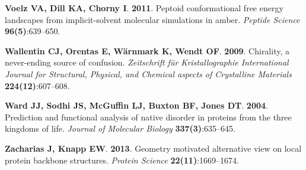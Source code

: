 \documentclass[fleqn,10pt,lineno]{wlpeerj} %
\begin{document}
\begin{thebibliography}{60}
\textbf{Voelz VA, Dill KA, Chorny I}. \textbf{2011}.
\newblock Peptoid conformational free energy landscapes from implicit-solvent
  molecular simulations in amber.
\newblock \emph{Peptide Science} \textbf{96(5)}:639--650.

\textbf{Wallentin CJ, Orentas E, W{\"a}rnmark K, Wendt OF}. \textbf{2009}.
\newblock Chirality, a never-ending source of confusion.
\newblock \emph{Zeitschrift f{\"u}r Kristallographie International Journal for
  Structural, Physical, and Chemical aspects of Crystalline Materials}
  \textbf{224(12)}:607--608.

\textbf{Ward JJ, Sodhi JS, McGuffin LJ, Buxton BF, Jones DT}. \textbf{2004}.
\newblock Prediction and functional analysis of native disorder in proteins
  from the three kingdoms of life.
\newblock \emph{Journal of Molecular Biology} \textbf{337(3)}:635--645.

\textbf{Zacharias J, Knapp EW}. \textbf{2013}.
\newblock Geometry motivated alternative view on local protein backbone
  structures.
\newblock \emph{Protein Science} \textbf{22(11)}:1669--1674.

\end{thebibliography}
\end{document}
